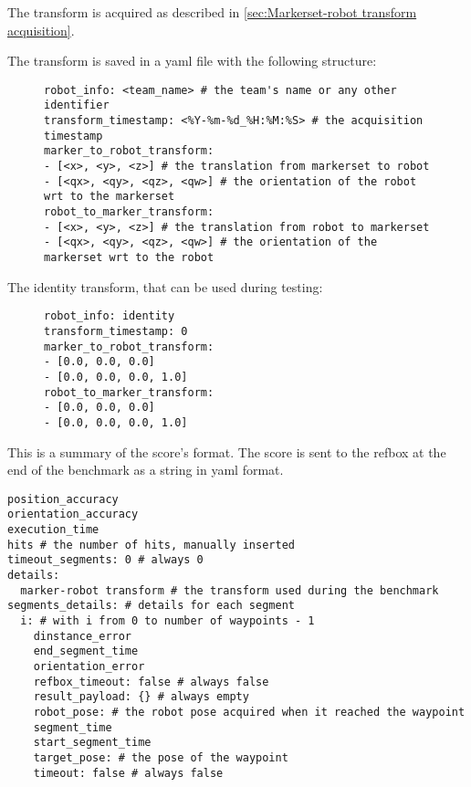 \documentclass[a4paper]{article}
\begin{document}
The transform is acquired as described in \ref{sec:Markerset-robot transform acquisition}.

The transform is saved in a yaml file with the following structure:


\begin{figure}[h!]
	\noindent
	\begin{minipage}[t!]{\linewidth}
		\begin{lstlisting}[caption=transform-<team_name>.yaml]
robot_info: <team_name> # the team's name or any other identifier
transform_timestamp: <%Y-%m-%d_%H:%M:%S> # the acquisition timestamp
marker_to_robot_transform:
- [<x>, <y>, <z>] # the translation from markerset to robot
- [<qx>, <qy>, <qz>, <qw>] # the orientation of the robot wrt to the markerset
robot_to_marker_transform:
- [<x>, <y>, <z>] # the translation from robot to markerset
- [<qx>, <qy>, <qz>, <qw>] # the orientation of the markerset wrt to the robot
    \end{lstlisting}
	\end{minipage}
\end{figure}


The identity transform, that can be used during testing:
\begin{figure}[h!]
	\noindent
	\begin{minipage}[t!]{\linewidth}
		\begin{lstlisting}[caption=transform-identity.yaml]
robot_info: identity
transform_timestamp: 0
marker_to_robot_transform:
- [0.0, 0.0, 0.0]
- [0.0, 0.0, 0.0, 1.0]
robot_to_marker_transform:
- [0.0, 0.0, 0.0]
- [0.0, 0.0, 0.0, 1.0]
    \end{lstlisting}
	\end{minipage}
\end{figure}


\label{sec:Score data format}

This is a summary of the score's format.
The score is sent to the refbox at the end of the benchmark as a string in yaml format.

\begin{verbatim}
position_accuracy
orientation_accuracy
execution_time
hits # the number of hits, manually inserted
timeout_segments: 0 # always 0
details:
  marker-robot transform # the transform used during the benchmark
segments_details: # details for each segment
  i: # with i from 0 to number of waypoints - 1
    dinstance_error
    end_segment_time
    orientation_error
    refbox_timeout: false # always false
    result_payload: {} # always empty
    robot_pose: # the robot pose acquired when it reached the waypoint
    segment_time
    start_segment_time
    target_pose: # the pose of the waypoint
    timeout: false # always false
\end{verbatim} 
\end{document}
